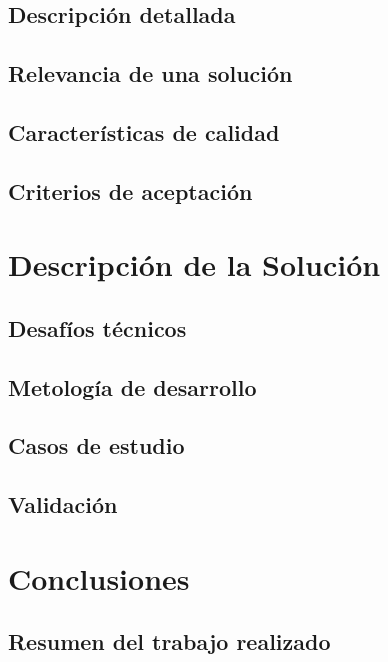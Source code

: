 \documentclass[upright, contnum]{umemoria}
\begin{document}
{\section{Descripción detallada}
\label{sec-3.1}

\section{Relevancia de una solución}
\label{sec-3.2}

\section{Características de calidad}
\label{sec-3.3}

\section{Criterios de aceptación}
\label{sec-3.4}


\chapter{Descripción de la Solución}
\label{sec-4}

\section{Desafíos técnicos}
\label{sec-4.1}

\section{Metología de desarrollo}
\label{sec-4.2}

\section{Casos de estudio}
\label{sec-4.3}

\section{Validación}
\label{sec-4.4}

\chapter{Conclusiones}
\label{sec-5}

\section{Resumen del trabajo realizado}
\label{sec-5.1}

}
\end{document}
